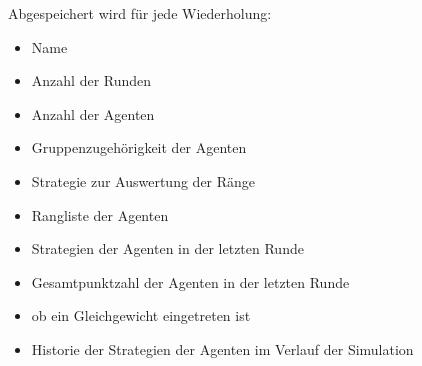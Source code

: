 Abgespeichert wird für jede Wiederholung:
\begin{itemize}
\item Name
\item Anzahl der Runden
\item Anzahl der Agenten
\item Gruppenzugehörigkeit der Agenten
\item Strategie zur Auswertung der Ränge
\item Rangliste der Agenten
\item Strategien der Agenten in der letzten Runde
\item Gesamtpunktzahl der Agenten in der letzten Runde
\item ob ein Gleichgewicht eingetreten ist
\item Historie der Strategien der Agenten im Verlauf der Simulation
\end{itemize}
